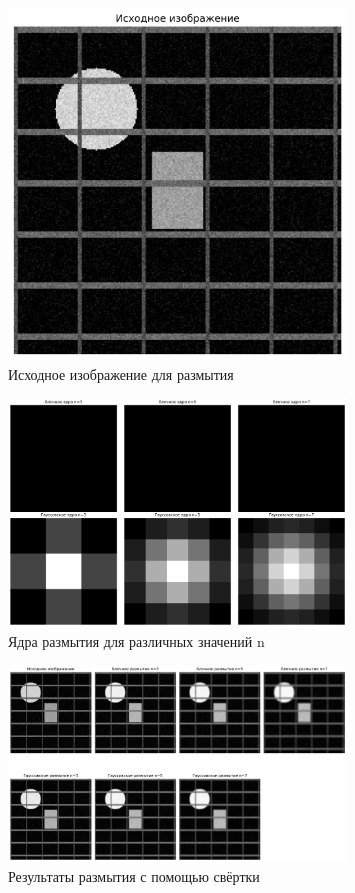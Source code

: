 \begin{figure}[H]
    \centering
    \includegraphics[width=0.8\textwidth]{images/task2/original_image.png}
    \caption{Исходное изображение для размытия}
    \label{fig:original_blur}
\end{figure}

\begin{figure}[H]
    \centering
    \includegraphics[width=0.8\textwidth]{images/task2/blur_kernels.png}
    \caption{Ядра размытия для различных значений n}
    \label{fig:blur_kernels}
\end{figure}

\begin{figure}[H]
    \centering
    \includegraphics[width=0.8\textwidth]{images/task2/convolution_results.png}
    \caption{Результаты размытия с помощью свёртки}
    \label{fig:convolution_blur}
\end{figure}

